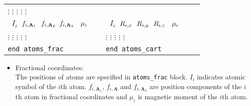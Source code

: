 \documentclass[10pt]{report}
\begin{document}
\begin{itemize}
\begin{center}
\begin{tabular}{p{0.4\linewidth}p{0.4\linewidth}}
           \hspace{0.3cm}  $\vdots$ \hspace{0.9cm}    $\vdots$ \hspace{0.45cm} $\vdots$ \hspace{0.55cm} $\vdots$ \hspace{0.4cm} $\vdots$ \\
        {\tt \hspace{0.2cm} $I_{i}$\hspace{0.35cm}  $ f_{i,\textbf{A}_1} \hspace{0.25cm} f_{i,\textbf{A}_2} \hspace{0.2cm} f_{i,\textbf{A}_3} \hspace{0.35cm} \mu_{i} $}  &
        {\tt \hspace{0.2cm} $I_{i}$\hspace{0.35cm}  $ R_{i,x} \hspace{0.25cm} R_{i,y} \hspace{0.25cm} R_{i,z}\hspace{0.35cm} \mu_{i} $}  \\
           \hspace{0.3cm}  $\vdots$ \hspace{0.9cm}    $\vdots$ \hspace{0.45cm} $\vdots$ \hspace{0.45cm} $\vdots$ \hspace{0.55cm} $\vdots$             &   
           \hspace{0.3cm}  $\vdots$ \hspace{0.9cm}    $\vdots$ \hspace{0.45cm} $\vdots$ \hspace{0.55cm} $\vdots$ \hspace{0.4cm} $\vdots$ \\
        {\tt end atoms\_frac}    & {\tt end atoms\_cart} \\
        \bottomrule
    \end{tabular}
\end{center}
\begin{itemize}
\item {Fractional coordinates:}\\
The positions of atoms are specified in {\tt atoms\_frac} block. 
$I_{i}$ indicates atomic symbol of the $i$th atom. $f_{i,\textbf{A}_1}$, $f_{i,\textbf{A}}$ and $f_{i,\textbf{A}_3}$ are position components of the $i$th atom 
in fractional coordinates and $\mu_i$ is magnetic moment of the $i$th atom.\\

\end{itemize}
\end{itemize}
\end{document}

